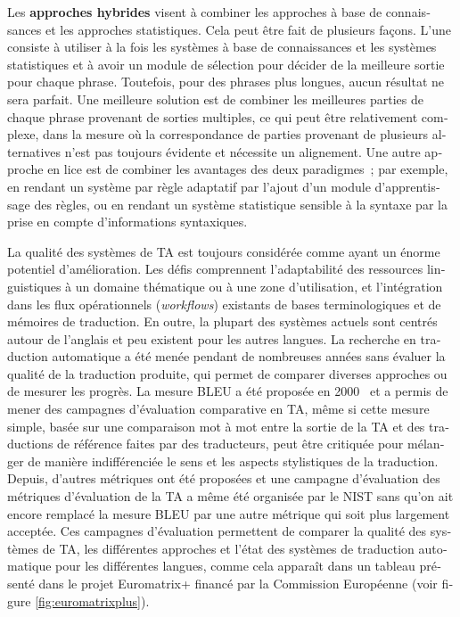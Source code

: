 \begin{french}
\begin{multicols}{2}
Les {\bf approches hybrides} visent à combiner les approches à base de
connaissances et les approches statistiques. Cela peut être fait de
plusieurs façons. L'une consiste à utiliser à la fois les
systèmes à base de connaissances et les systèmes statistiques et à
avoir un module de sélection pour décider de la meilleure sortie pour
chaque phrase. Toutefois, pour des phrases plus longues, aucun
résultat ne sera parfait. Une meilleure solution est de combiner les
meilleures parties de chaque phrase provenant de sorties multiples, ce
qui peut être relativement complexe, dans la mesure où la
correspondance de parties provenant de plusieurs alternatives n'est pas toujours évidente et nécessite un alignement. Une autre
approche en lice est de combiner les avantages des deux paradigmes~;
par exemple, en rendant un système par règle adaptatif par l'ajout d'un module d'apprentissage des règles, ou
en rendant un système statistique sensible à la syntaxe par la prise
en compte d'informations syntaxiques.

La qualité des systèmes de TA est toujours considérée comme ayant un
énorme potentiel d'amélioration. Les défis comprennent l'adaptabilité
des ressources linguistiques à un domaine thématique ou à une zone
d'utilisation, et l'intégration dans les flux opérationnels ({\em workflows}) existants de bases
terminologiques et de mémoires de traduction. En outre, la plupart des
systèmes actuels sont centrés autour de l'anglais et peu existent pour
les autres langues. La recherche en traduction automatique a été menée
pendant de nombreuses années sans évaluer la qualité de la traduction
produite, qui permet de comparer diverses approches ou de mesurer les
progrès. La mesure BLEU a été proposée en 2000~\cite{bleu02} et a permis de mener
des campagnes d'évaluation comparative en TA, même si cette mesure
simple, basée sur une comparaison mot à mot entre la sortie de la
TA et des traductions de référence faites par des
traducteurs, peut être critiquée pour mélanger de manière
indifférenciée le sens et les aspects stylistiques de la
traduction. Depuis, d'autres métriques ont été proposées et une
campagne d'évaluation des métriques d'évaluation de la TA a même été
organisée par le NIST sans qu'on ait encore remplacé la mesure BLEU
par une autre métrique qui soit plus largement acceptée. Ces campagnes
d'évaluation permettent de comparer la qualité des systèmes de TA, les
différentes approches et l'état des systèmes de traduction automatique pour les
différentes langues, comme cela apparaît dans un tableau présenté dans
le projet Euromatrix+ financé par la Commission Européenne (voir figure \ref{fig:euromatrixplus}).




\end{multicols}
\end{french}
